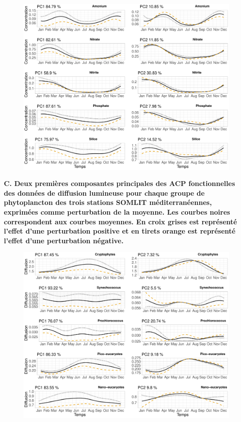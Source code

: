 \documentclass[12pt]{article}
\begin{document}
\begin{appendices}
\begin{figure}
\centering
\includegraphics[width=\textwidth, height=.75\textheight]{fig/ANNEXE_fpca_nut.pdf}
\end{figure}

\newpage

{\bfseries C. Deux premières composantes principales des ACP fonctionnelles des données de diffusion lumineuse pour chaque groupe de phytoplancton des trois stations SOMLIT méditerranéennes, exprimées comme perturbation de la moyenne. Les courbes noires correspondent aux courbes moyennes. En croix grises est représenté l’effet d’une perturbation positive et en tirets orange est représenté l’effet d’une perturbation négative. }

\begin{figure}
\centering
\includegraphics[width=\textwidth, height=.75\textheight]{fig/ANNEXE_fpca_diff.pdf}
\end{figure}


\end{appendices}
\end{document}
